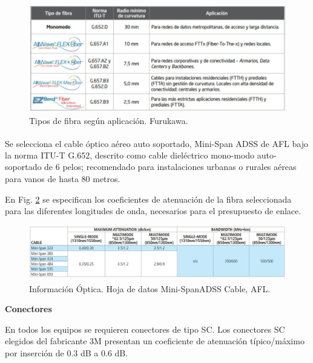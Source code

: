 \documentclass[12pt,a4paper]{book}
\begin{document}
\begin{figure} [H]
\centering
\includegraphics[width = 15cm]{../figuras/Tabla_recomend_Fibras_Furukawa.JPG}
\caption{Tipos de fibra según aplicación. Furukawa.}
\label{Tabla_recomend_Fibras_Frkwa}
\end{figure}

Se selecciona el cable óptico aéreo auto soportado, Mini-Span ADSS\textsuperscript \textregistered {} de AFL bajo la norma ITU-T G.652, descrito como cable dieléctrico mono-modo auto-soportado
de 6 pelos; recomendado para
instalaciones urbanas o rurales aéreas para vanos de hasta 80 metros.

 \medskip

En Fig. \ref{tabla_info_optica_minispanAFL} se especifican los coeficientes de atenuación de la fibra
seleccionada para las diferentes longitudes de onda, necesarios para el
presupuesto de enlace.

\medskip 

\begin{figure} [H]
\centering
\includegraphics[width = 15cm]{../figuras/Informacion_Optica_MiniSpanAFL.JPG}
\caption{Información Óptica. Hoja de datos Mini-Span\textsuperscript \textregistered \thinspace ADSS Cable, AFL.}
\label{tabla_info_optica_minispanAFL}
\end{figure}

\medskip 

\large
\noindent\textbf{Conectores}
\normalsize
\medskip

En todos los equipos se requieren conectores de tipo SC. Los conectores
SC elegidos del fabricante 3M presentan un coeficiente de atenuación
típico/máximo por inserción de 0.3 dB a 0.6 dB. 
\end{document}
